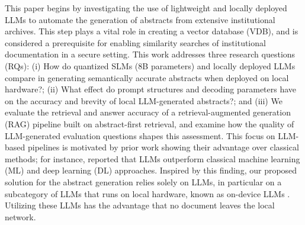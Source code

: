 \documentclass[bdcc,article,submit,pdftex,moreauthors]{Definitions/mdpi}
\newif\ifshowchanges
\newcommand{\nkdel}[1]{\ifshowchanges{\color{red}\sout{#1}}\fi}
\newcommand{\commentRed}[1]{\textcolor{red}{#1}}
\newif\ifshowchanges
\DeclareRobustCommand{\nkdel}[1]{\ifshowchanges{\color{red}\sout{#1}}\fi}
\begin{document}
This paper begins by investigating the use of lightweight and locally deployed LLMs to automate the generation of abstracts from extensive institutional archives. This step plays a vital role in creating a vector database (VDB), and is considered a prerequisite for enabling similarity searches of institutional documentation in a secure setting.
This work addresses three research questions (RQs):
(i) How do quantized SLMs (8B parameters) and locally deployed LLMs compare in  generating semantically accurate abstracts when deployed on local hardware?; (ii) What effect do prompt structures and decoding parameters have on the accuracy and brevity of local LLM-generated abstracts?; and (iii)
We evaluate the retrieval and answer accuracy of a retrieval-augmented
generation (RAG) pipeline built on abstract-first retrieval, and examine
how the quality of LLM-generated evaluation questions shapes this
assessment. This focus on LLM-based pipelines is motivated by prior work
showing their advantage over classical methods; for instance,
\citet{munzir2025large} reported that LLMs outperform classical machine
learning (ML) and deep learning (DL) approaches. Inspired by this finding, our proposed solution for the abstract generation relies solely on LLMs, in particular on a subcategory of LLMs that runs on local hardware, known as on-device LLMs \citep{qu2025mobileedgeintelligencelarge}.
Utilizing these LLMs has the advantage that no document leaves the local network.
\end{document}
